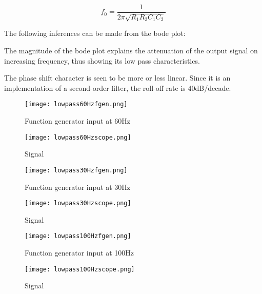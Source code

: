 \documentclass{article}
\begin{document}
\[
f_0 = \frac{1}{2\pi \sqrt{R_1 R_2 C_1 C_2}}
\]

The following inferences can be made from the bode plot:

The magnitude of the bode plot explains the attenuation of the output signal on increasing frequency, thus showing its low pass characteristics.

The phase shift character is seen to be more or less linear. Since it is an implementation of a second-order filter, the roll-off rate is 40dB/decade.
\begin{figure}[ht]
  \centering
  \texttt{[image: lowpass60Hzfgen.png]}
  \caption{Function generator input at 60Hz}
  \label{fig:output_120Hz}
\end{figure}
\begin{figure}[ht]
  \centering
  \texttt{[image: lowpass60Hzscope.png]}
  \caption{ Signal}
  \label{fig:output_120Hz}
\end{figure}
\begin{figure}[ht]
  \centering
  \texttt{[image: lowpass30Hzfgen.png]}
  \caption{Function generator input at 30Hz}
  \label{fig:output_120Hz}
\end{figure}
\begin{figure}[ht]
  \centering
  \texttt{[image: lowpass30Hzscope.png]}
  \caption{ Signal}
  \label{fig:output_120Hz}
\end{figure}
\begin{figure}[ht]
  \centering
  \texttt{[image: lowpass100Hzfgen.png]}
  \caption{Function generator input at 100Hz}
  \label{fig:output_120Hz}
\end{figure}
\begin{figure}[ht]
  \centering
  \texttt{[image: lowpass100Hzscope.png]}
  \caption{ Signal}
  \label{fig:output_120Hz}
\end{figure}
\end{document}

